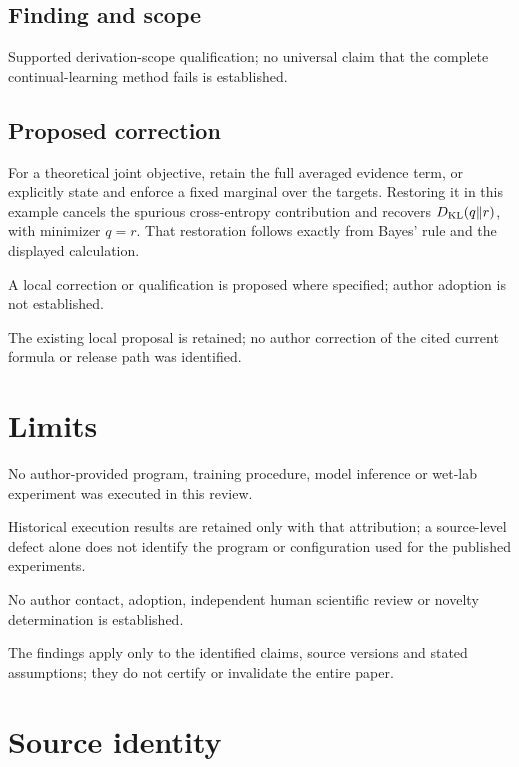 \documentclass[11pt]{article}
\begin{document}
\subsection*{Finding and scope}

Supported derivation-scope qualification; no universal claim that the complete continual-learning method fails is established.

\subsection*{Proposed correction}

For a theoretical joint objective, retain the full averaged evidence term, or explicitly state and enforce a fixed marginal over the targets. Restoring it in this example cancels the spurious cross-entropy contribution and recovers \(D_{\rm KL}(q\Vert r)\), with minimizer \(q=r\). That restoration follows exactly from Bayes’ rule and the displayed calculation.

A local correction or qualification is proposed where specified; author adoption is not established.

The existing local proposal is retained; no author correction of the cited current formula or release path was identified.

\section*{Limits}

No author-provided program, training procedure, model inference or wet-lab experiment was executed in this review.\par

Historical execution results are retained only with that attribution; a source-level defect alone does not identify the program or configuration used for the published experiments.\par

No author contact, adoption, independent human scientific review or novelty determination is established.\par

The findings apply only to the identified claims, source versions and stated assumptions; they do not certify or invalidate the entire paper.\par

\section*{Source identity}
\end{document}
